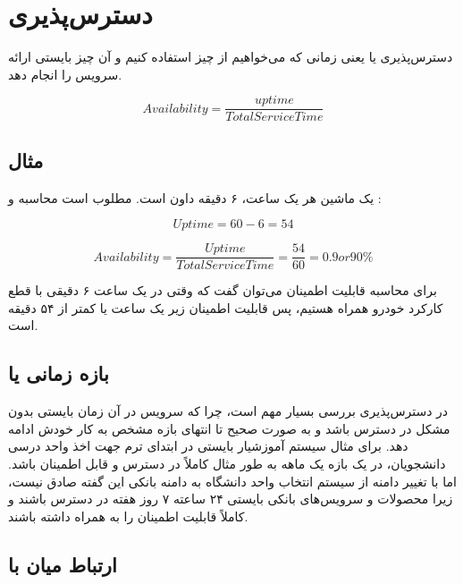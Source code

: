 \section{دسترس‌پذیری}

دسترس‌پذیری یا   یعنی زمانی که می‌خواهیم از چیز استفاده کنیم و
آن چیز بایستی ارائه سرویس را انجام دهد.

\begin{equation}
    Availability = \frac{uptime}{Total Service Time}
\end{equation}

\subsection*{مثال}

یک ماشین هر یک ساعت، ۶ دقیقه داون است. مطلوب است محاسبه  و
:

\begin{equation}
    Uptime = 60-6 = 54
\end{equation}

\begin{equation}
    Availability = \frac{Uptime}{Total Service Time} = \frac{54}{60} = 0.9 or 90\%
\end{equation}

برای محاسبه قابلیت اطمینان می‌توان گفت که وقتی در یک ساعت ۶ دقیقی با قطع کارکرد
خودرو همراه هستیم، پس قابلیت اطمینان زیر یک ساعت یا کمتر از ۵۴ دقیقه است.

\subsection{بازه زمانی یا }

در دسترس‌پذیری بررسی  بسیار مهم است، چرا که سرویس در آن زمان
بایستی بدون مشکل در دسترس باشد و به صورت صحیح تا انتهای بازه مشخص  به کار خودش ادامه دهد. برای مثال سیستم آموزشیار بایستی در ابتدای ترم جهت
اخذ واحد درسی دانشجویان، در یک بازه یک ماهه به طور مثال کاملاً در دسترس و قابل
اطمینان باشد. اما با تغییر دامنه از سیستم انتخاب واحد دانشگاه به دامنه بانکی این
گفته صادق نیست، زیرا محصولات و سرویس‌‌های بانکی بایستی ۲۴ ساعته ۷ روز هفته در
دسترس باشند و کاملاً قابلیت اطمینان را به همراه داشته باشند.

\subsection{ارتباط میان  با }

